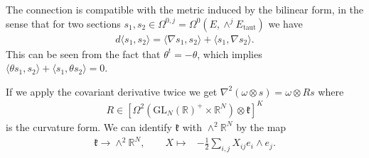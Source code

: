\documentclass[a4paper,11pt]{amsart} %
\newcommand{\8}{\infty}
\newcommand{\GL}{\mathrm{GL}}
\newcommand{\R}{\mathbb{R}}
\newcommand{\kfrak}{\mathfrak{k}}
\newcommand{\taut}{\textrm{taut}}
\theoremstyle{mytheoremstyle}
\theoremstyle{remark}
\numberwithin{equation}{section}
\begin{document}
The connection is compatible with the metric induced by the bilinear form, in the sense that for two sections $s_1,s_2 \in \Omega^{0,j}=\Omega^0(E,\wedge^j E_{\taut})$ we have
\begin{align}
    d \langle s_1,s_2\rangle = \langle \nabla s_1, s_2 \rangle + \langle s_1,\nabla s_2 \rangle.
\end{align}
This can be seen from the fact that $\theta^t=-\theta$, which implies $\langle \theta s_1, s_2 \rangle + \langle s_1,\theta s_2 \rangle =0.  
$

If we apply the covariant derivative twice we get $ \nabla^2 (\omega \otimes  s) = \omega \otimes R s$ where 
\begin{align}
    R \in [\Omega^2(\GL_N(\R)^+ \times \R^{N}) \otimes \kfrak]^K
\end{align}
is the curvature form. We can identify $\kfrak$ with $\wedge^2\R^{N}$ by the map
\begin{align} \label{idenso}
    \kfrak \longrightarrow \wedge^2\R^{N}, \qquad
    X  \longmapsto &  -\frac{1}{2}\sum_{i,j} X_{ij}e_i \wedge e_j.
\end{align}
\end{document}
